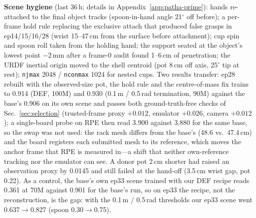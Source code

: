 \textbf{Scene hygiene} \cut (last 36\,h; details in Appendix~\ref{app:patha-prime}): hands
re-attached to the final object tracks (spoon-in-hand angle 21$^\circ$ off before); a per-frame
hold rule replacing the exclusive attach that produced false grasps in ep14/15/16/28 (wrist
15--47\,cm from the surface before attachment); cup spin and spoon roll taken from the holding
hand; the support seated at the object's lowest point $-2$\,mm after a frame-0 audit found
1--6\,cm of penetration; the URDF inertial origin moved to the shell centroid (pot 8\,cm off axis,
25$^\circ$ tip at rest); \texttt{njmax} 2048 / \texttt{nconmax} 1024 for nested cups. Two results
transfer: ep28 rebuilt with the observed-size pot, the hold rule and the centre-of-mass fix trains
to 0.914 (DEF, 100M) and 0.930 (0.1\,m / 0.5\,rad termination, 90M) against the base's 0.906 on its
own scene and passes both ground-truth-free checks of Sec.~\ref{sec:selection} (trusted-frame
proxy $+0.012$, emulator $+0.026$, camera $+0.012$); a single-board probe on RPE then read 3.900
against 3.880 for the same base, so the swap was not used: the rack mesh differs from the base's
(48.6 vs.\ 47.4\,cm) and the board registers each submitted mesh to its reference, which moves the
anchor frame that RPE is measured in---a shift that neither own-reference tracking nor the emulator
can see. A donor pot 2\,cm shorter had raised an observation proxy by 0.0145 and still failed at
the hand-off (3.5\,cm wrist gap, pot 0.22). As a control, the base's own ep33 scene trained with our DEF recipe reads 0.361 at
70M against 0.901 for the base's run, so on ep33 the recipe, not the reconstruction, is the gap:
with the 0.1\,m / 0.5\,rad thresholds our ep33 scene went 0.637$\rightarrow$0.827 (spoon
0.30$\rightarrow$0.75).

